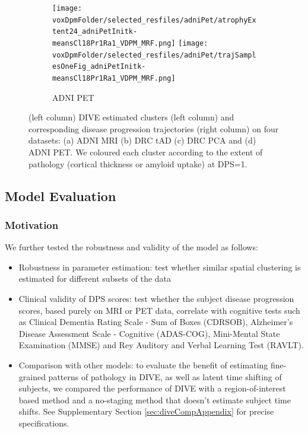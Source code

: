 \begin{figure}
  \begin{subfigure}[b]{\textwidth}
   \centering
  \texttt{[image: \\voxDpmFolder/selected\_resfiles/adniPet/atrophyExtent24\_adniPetInitk-meansCl18Pr1Ra1\_VDPM\_MRF.png]} \texttt{[image: \\voxDpmFolder/selected\_resfiles/adniPet/trajSamplesOneFig\_adniPetInitk-meansCl18Pr1Ra1\_VDPM\_MRF.png]}
    \caption{ADNI PET}
    \label{diveClustAdniPet}
  \end{subfigure}
  

  \caption[DIVE Results on ADNI and DRC cohorts]{(left column) DIVE estimated clusters (left column) and corresponding disease progression trajectories (right column) on four datasets: (a) ADNI MRI (b) DRC tAD (c) DRC PCA and (d) ADNI PET. We coloured each cluster according to the extent of pathology (cortical thickness or amyloid uptake) at DPS=1.}
  \label{diveClustTrajAll}
\end{figure}


\subsection{Model Evaluation}
\label{sec:diveEval}

\subsubsection{Motivation}
\label{sec:diveEvalMotiv}

We further tested the robustness and validity of the model as follows: 
\begin{itemize}
 \item Robustness in parameter estimation: test whether similar spatial clustering is estimated for different subsets of the data
 \item Clinical validity of DPS scores: test whether the subject disease progression scores, based purely on MRI or PET data, correlate with cognitive tests such as Clinical Dementia Rating Scale - Sum of Boxes (CDRSOB), Alzheimer's Disease Assessment Scale - Cognitive (ADAS-COG), Mini-Mental State Examination (MMSE) and Rey Auditory and Verbal Learning Test (RAVLT).
 \item Comparison with other models: to evaluate the benefit of estimating fine-grained patterns of pathology in DIVE, as well as latent time shifting of subjects, we compared the performance of DIVE with a region-of-interest based method \cite{jedynak2012computational} and a no-staging method that doesn't estimate subject time shifts. See Supplementary Section \ref{sec:diveCompAppendix} for precise specifications.
\end{itemize}


